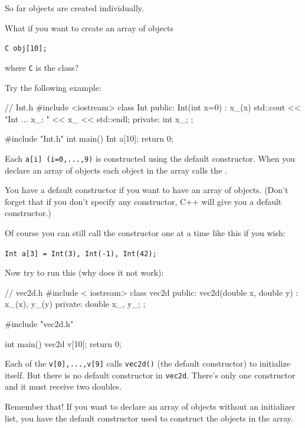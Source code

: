 \newpage{}

So far objects are created individually.

What if you want to create an array of objects
\begin{center}
\texttt{C obj[10];}
\end{center}
where \texttt{C} is the class?

Try the following example:
\begin{console}
// Int.h
#include <iostream>
class Int
{     
public:
        Int(int x=0)
           : x_(x)
        {
             std::cout << "Int ... x_: " << x_
                       << std::endl;
        }
private:
        int x_;
};
\end{console}
\begin{console}
#include "Int.h"
int main()
{   
    Int a[10];
    return 0;
}
\end{console}
 Each \texttt{a[i] (i=0,...,9)} is constructed using the
default constructor. When you declare an array of objects each object in
the array calls the .

You  have a default constructor if you want to have an
array of objects. (Don't forget that if you
don't specify any constructor, C++ will give you a
default constructor.)

Of course you can still call the constructor one at a time like this if
you wish:
\begin{center}
\texttt{Int a[3] = {Int(3), Int(-1), Int(42)};}
\end{center}
Now try to run this (why does it not work):
\begin{console}
// vec2d.h
#include < iostream>
class vec2d
{
public:
        vec2d(double x, double y)
                : x_(x), y_(y)
                {}
private:
        double x_, y_;
};
\end{console}
\begin{console}
#include "vec2d.h"

int main()
{   
    vec2d v[10];
    return 0;
}
\end{console}
 Each of the \texttt{v[0],...,v[9]} calls \texttt{vec2d()}
(the default constructor) to initialize itself. But there is no default
constructor in \texttt{vec2d}. There's only one
constructor and it must receive two doubles.

Remember that! If you want to declare an array of objects without an
initializer list, you  have the default constructor used to
construct the objects in the array.

